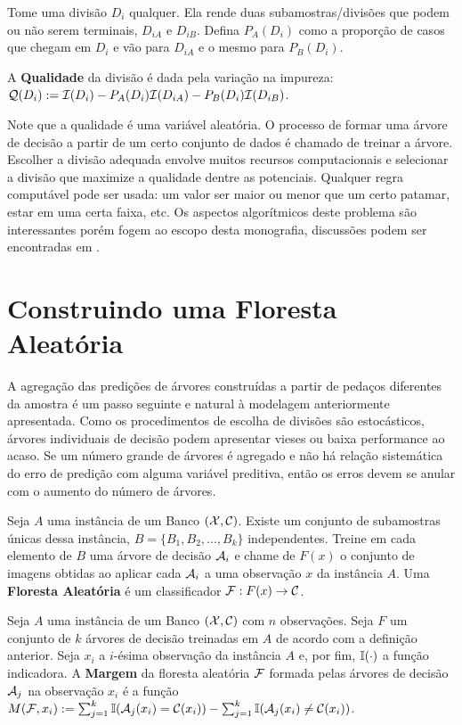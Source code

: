 Tome uma divisão $D_i$ qualquer. Ela rende duas subamostras/divisões que podem ou não serem terminais, $D_{iA}$ e $D_{iB}$. Defina $P_A (D_i)$ como a proporção de casos que chegam em $D_i$ e vão para $D_{iA}$ e o mesmo para $P_B (D_i)$.

\begin{defi}
A \textbf{Qualidade} da divisão é dada pela variação na impureza: $\mathcal{Q} (D_i) := \mathcal{I}(D_i) - P_A(D_i) \mathcal{I} (D_{iA}) - P_B(D_i) \mathcal{I} (D_{iB})$.
\end{defi}

Note que a qualidade é uma variável aleatória. O processo de formar uma árvore de decisão a partir de um certo conjunto de dados é chamado de treinar a árvore. Escolher a divisão adequada envolve muitos recursos computacionais e selecionar a divisão que maximize a qualidade dentre as potenciais. Qualquer regra computável pode ser usada: um valor ser maior ou menor que um certo patamar, estar em uma certa faixa, etc. Os aspectos algorítmicos deste problema são interessantes porém fogem ao escopo desta monografia, discussões podem ser encontradas em .
 
 \section{Construindo uma Floresta Aleatória}
 
 A agregação das predições de árvores construídas a partir de pedaços diferentes da amostra é um passo seguinte e natural à modelagem anteriormente apresentada. Como os procedimentos de escolha de divisões são estocásticos, árvores individuais de decisão podem apresentar vieses ou baixa performance ao acaso. Se um número grande de árvores é agregado e não há relação sistemática do erro de predição com alguma variável preditiva, então os erros devem se anular com o aumento do número de árvores.
 
 \begin{defi}
 Seja $A$ uma instância de um Banco $(\mathcal{X}, \mathcal{C})$. Existe um conjunto de subamostras únicas dessa instância, $B = \{ B_1, B_2, ..., B_k\}$  independentes. Treine em cada elemento de $B$ uma árvore de decisão $\mathcal{A}_i$ e chame de $F(x)$ o conjunto de imagens obtidas ao aplicar cada $\mathcal{A}_i$ a uma observação $x$ da instância $A$. Uma \textbf{Floresta Aleatória} é um classificador $\mathcal{F} : F(x) \to \mathcal{C}$. 
  \end{defi}
  
  \begin{defi}
  Seja $A$ uma instância de um Banco $(\mathcal{X}, \mathcal{C})$ com $n$ observações. Seja $F$ um conjunto de $k$ árvores de decisão treinadas em $A$ de acordo com a definição anterior. Seja $x_i$ a $i$-ésima observação da instância $A$ e, por fim, $\mathbb{I}(\cdot)$ a função indicadora. A \textbf{Margem} da floresta aleatória $\mathcal{F}$ formada pelas árvores de decisão $\mathcal{A}_j$ na observação $x_i$ é a função $M(\mathcal{F}, x_i) := \sum_{j=1}^k \mathbb{I} ( \mathcal{A}_j (x_i) = \mathcal{C}(x_i) ) - \sum_{j=1}^k \mathbb{I}  ( \mathcal{A}_j (x_i) \neq \mathcal{C}(x_i) )$.
  \end{defi}
  

